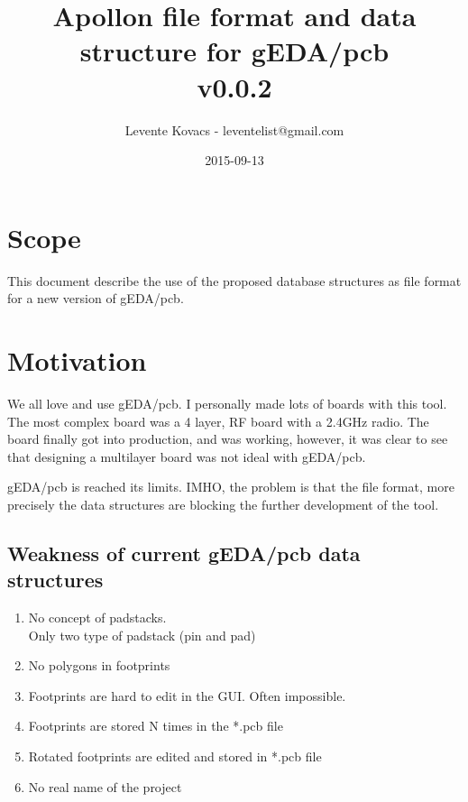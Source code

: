 \documentclass[12pt]{article}
\begin{document}
\title{Apollon file format and data structure for gEDA/pcb\\v0.0.2}
\date{2015-09-13}
\author{Levente Kovacs - leventelist@gmail.com}

\maketitle
\tableofcontents

\section{Scope}\label{scope}

This document describe the use of the proposed database structures as
file format for a new version of gEDA/pcb.

\section{Motivation}\label{motivation}

We all love and use gEDA/pcb. I personally made lots of boards with this tool.
The most complex board was a 4 layer, RF board with a 2.4GHz radio. The
board finally got into production, and was working, however, it was
clear to see that designing a multilayer board was not ideal with gEDA/pcb.

gEDA/pcb is reached its limits. IMHO, the problem is that the file format,
more precisely the data structures are blocking the further development of
the tool.

\subsection{Weakness of current gEDA/pcb data
structures}\label{weakness-of-current-gedapcb-data-structures}

\begin{enumerate}
\item
  No concept of padstacks.\\ Only two type of padstack (pin and pad)
\item
  No polygons in footprints
\item
  Footprints are hard to edit in the GUI. Often impossible.
\item
  Footprints are stored N times in the *.pcb file
\item
  Rotated footprints are edited and stored in *.pcb file
\item
  No real name of the project
\end{enumerate}
\end{document}
